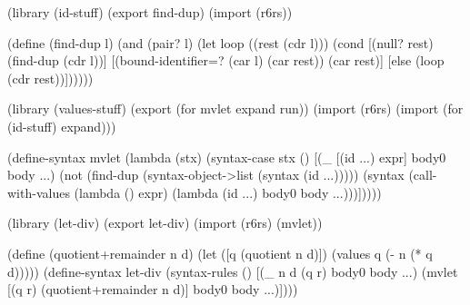 \begin{schemenoindent}
(library (id-stuff)
  (export find-dup)
  (import (r6rs))

  (define (find-dup l)
    (and (pair? l)
         (let loop ((rest (cdr l)))
           (cond
            [(null? rest) (find-dup (cdr l))]
            [(bound-identifier=? (car l) (car rest)) 
                                 (car rest)]
            [else (loop (cdr rest))])))))

(library (values-stuff)
  (export (for mvlet expand run))
  (import (r6rs) (import (for (id-stuff) expand)))

  (define-syntax mvlet
    (lambda (stx)
      (syntax-case stx ()
        [(\_ [(id ...) expr] body0 body ...)
         (not (find-dup
                (syntax-object->list
                  (syntax (id ...)))))
         (syntax
           (call-with-values
               (lambda () expr) 
             (lambda (id ...) body0 body ...)))]))))

(library (let-div)
  (export let-div)
  (import (r6rs) (mvlet))

  (define (quotient+remainder n d)
    (let ([q (quotient n d)])
      (values q (- n (* q d)))))
  (define-syntax let-div
    (syntax-rules ()
     [(\_ n d (q r) body0 body ...)
      (mvlet [(q r) (quotient+remainder n d)]
        body0 body ...)])))%
\end{schemenoindent}


